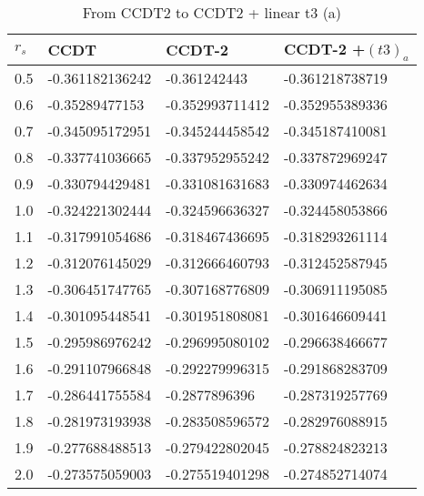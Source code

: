 \begin{table}[hbtp]
\caption{From CCDT2 to CCDT2 + linear t3 (a)}
\begin{center}
\begin{threeparttable}
\begin{tabular}{l l l l}
    \toprule
$r_s$ & CCDT & CCDT-2 & CCDT-2 +$(t3)_a$  \\ \hline
0.5 & -0.361182136242 & -0.361242443 & -0.361218738719   \\
0.6 & -0.35289477153 & -0.352993711412 & -0.352955389336   \\
0.7 & -0.345095172951 & -0.345244458542 & -0.345187410081   \\
0.8 & -0.337741036665 & -0.337952955242 & -0.337872969247   \\
0.9 & -0.330794429481 & -0.331081631683 & -0.330974462634   \\
1.0 & -0.324221302444 & -0.324596636327 & -0.324458053866   \\
1.1 & -0.317991054686 & -0.318467436695 & -0.318293261114  \\
1.2 & -0.312076145029 & -0.312666460793 & -0.312452587945   \\
1.3 & -0.306451747765 & -0.307168776809 & -0.306911195085  \\
1.4 & -0.301095448541 & -0.301951808081 & -0.301646609441   \\
1.5 & -0.295986976242 & -0.296995080102 & -0.296638466677   \\
1.6 & -0.291107966848 & -0.292279996315 & -0.291868283709   \\
1.7 & -0.286441755584 & -0.2877896396 & -0.287319257769  \\
1.8 & -0.281973193938 & -0.283508596572 & -0.282976088915   \\
1.9 & -0.277688488513 & -0.279422802045 & -0.278824823213   \\
2.0 & -0.273575059003 & -0.275519401298 & -0.274852714074   \\
\bottomrule
\end{tabular}
\begin{tablenotes}
\end{tablenotes}
\end{threeparttable}
\end{center}
\label{tab:ccd2_to_ccdt3_1}
\end{table}

